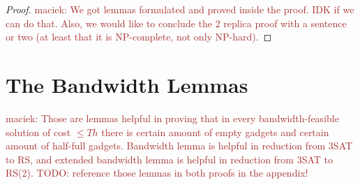\documentclass[9pt]{sigcomm-alternate}
\newcommand{\maciek}[1]{\textcolor{brown}{maciek: #1}}
\newcommand{\clauses}{\alpha}
\newcommand{\variables}{\beta}
\newcommand{\Thr}{\ensuremath{Th}}
\begin{document}
\begin{appendix}
\begin{proof}
\maciek{We got lemmas formulated and proved inside the proof. IDK if we can do that. Also, we would like to conclude the 2 replica proof with a sentence or two (at least that it is NP-complete, not only NP-hard).}
\end{proof}

%
%
%
%
%
%
\section{The Bandwidth Lemmas}

\maciek{Those are lemmas helpful in proving that in every bandwidth-feasible solution of cost $\leq \Thr$ there is certain amount of empty gadgets and certain amount of half-full gadgets. Bandwidth lemma is helpful in reduction from 3SAT to RS, and extended bandwidth lemma is helpful in reduction from 3SAT to RS(2). TODO: reference those lemmas in both proofs in the appendix!}
  

\end{appendix}
\end{document}
